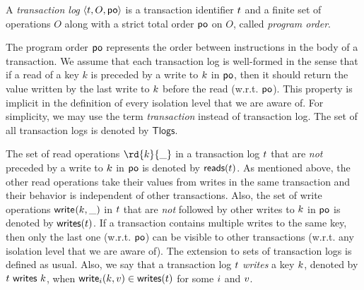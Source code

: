 \begin{definition}
 A \emph{transaction log} $\tup{\tr,O, \po}$ is a transaction identifier $\tr$ and a finite set of operations $O$ along with a strict total order $\po$ on $O$, called \emph{program order}.
\end{definition}

The program order $\po$ represents the order between instructions in the body of a transaction. We assume that each transaction log is well-formed in the sense that if a read of a key $k$ is preceded by a write to $\key$ in $\po$, then it should return the value written by the last write to $\key$ before the read (w.r.t. $\po$). This property is implicit in the definition of every isolation level that we are aware of. For simplicity, we may use the term \emph{transaction} instead of transaction log. The  set of all transaction logs is denoted by $\mathsf{Tlogs}$.


The set of read operations $\rd{\key}{\_}$ in a transaction log $\tr$ that are \emph{not} preceded by a write to $\key$ in $\po$ is denoted by $\readOp{\tr}$. As mentioned above, the other read operations take their values from writes in the same transaction and their behavior is independent of other transactions. Also, the set of write operations $\wrt{\key}{\_}$ in $\tr$ that are \emph{not} followed by other writes to $\key$ in $\po$ is denoted by $\writeOp{\tr}$. If a transaction contains multiple writes to the same key, then only the last one (w.r.t. $\po$) can be visible to other transactions (w.r.t. any isolation level that we are aware of). The extension to sets of transaction logs is defined as usual. 
Also, we say that a transaction log $\tr$ \emph{writes} a key $\key$, denoted by $\writeVar{\tr}{\key}$, when $\wrt[\id]{\key}{\val}\in \writeOp{\tr}$ for some $\id$ and $\val$. 



